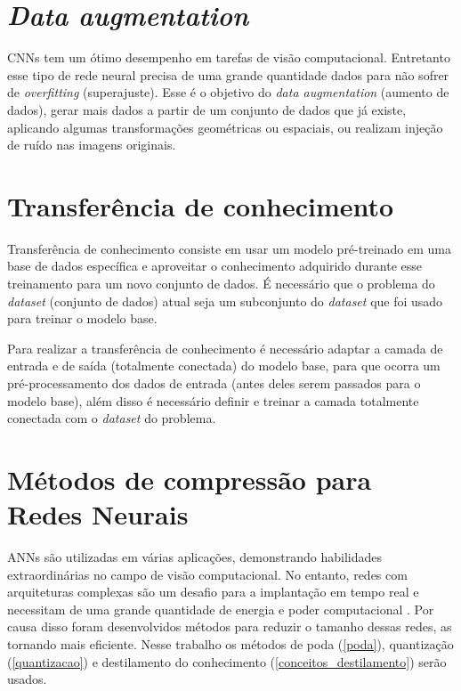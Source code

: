 \section{\textit{Data augmentation}}\label{cap_conceitos_data_augmentation}
CNNs tem um ótimo desempenho em tarefas de visão computacional. Entretanto esse tipo de rede neural precisa de uma
grande quantidade dados para não sofrer de \textit{overfitting} (superajuste). \cite{shorten2019survey}
Esse é o objetivo do \textit{data augmentation} (aumento de dados), gerar mais dados a partir de um conjunto de dados
que já existe, aplicando algumas transformações geométricas ou espaciais, ou realizam injeção de ruído nas imagens
originais.


\section{Transferência de conhecimento}\label{cap_conceitos_transferencia}
Transferência de conhecimento consiste em usar um modelo pré-treinado em uma base de dados específica e aproveitar
o conhecimento adquirido durante esse treinamento para um novo conjunto de dados.
É necessário que o problema do \textit{dataset} (conjunto de dados) atual seja um subconjunto do \textit{dataset}
que foi usado para treinar o modelo base.

Para realizar a transferência de conhecimento é necessário adaptar a camada de entrada e de saída
(totalmente conectada) do modelo base, para que ocorra um pré-processamento dos dados de entrada
(antes deles serem passados para o modelo base), além disso é necessário definir e treinar a camada totalmente
conectada com o \textit{dataset} do problema.

\section{Métodos de compressão para Redes Neurais}\label{cap_conceitos_compressao_redes}
ANNs são utilizadas em várias aplicações, demonstrando habilidades extraordinárias no campo de visão computacional.
No entanto, redes com arquiteturas complexas são um desafio para a implantação em tempo real e necessitam de uma
grande quantidade de energia e poder computacional \cite{LIANG2021370}.
Por causa disso foram desenvolvidos métodos para reduzir o tamanho dessas redes, as tornando mais eficiente.
Nesse trabalho os métodos de poda (\ref{poda}), quantização (\ref{quantizacao}) e destilamento do conhecimento
(\ref{conceitos_destilamento}) serão usados.

